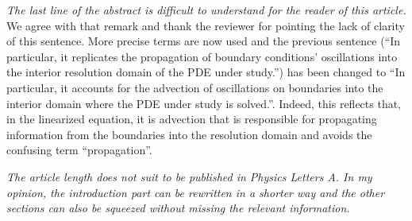 \documentclass{article}
\begin{document}
\bigskip{}

\emph{
The last line of the abstract is difficult to understand for the reader of this article.
}
We agree with that remark and thank the reviewer for pointing the lack of clarity of this sentence.
More precise terms are now used and the previous sentence (``In particular, it replicates the propagation of boundary conditions’ oscillations into the interior resolution domain of the PDE under study.'') has been changed to ``In particular, it accounts for the advection of oscillations on boundaries into the interior domain where the PDE under study is solved.''. Indeed, this reflects that, in the linearized equation, it is advection that is responsible for propagating information from the boundaries into the resolution domain and avoids the confusing term ``propagation''.

\bigskip{}

\emph{
The article length does not suit to be published in Physics Letters A. In my opinion, the introduction part can be rewritten in a shorter way and the other sections can also be squeezed without missing the relevant information.
}
\end{document}
